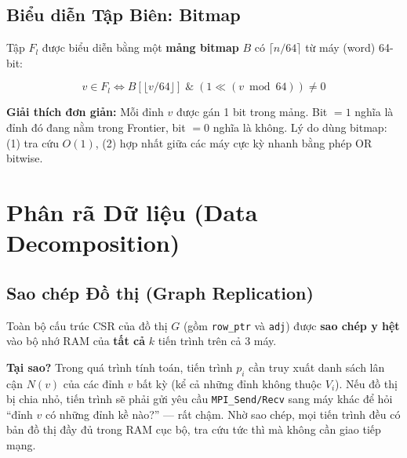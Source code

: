 \documentclass[12pt,a4paper]{article}
\begin{document}
\subsection{Biểu diễn Tập Biên: Bitmap}

Tập $F_l$ được biểu diễn bằng một \textbf{mảng bitmap} $B$ có $\lceil n / 64 \rceil$ từ máy (word) 64-bit:

\begin{equation}
v \in F_l \iff B\left[\lfloor v / 64 \rfloor\right] \;\&\; (1 \ll (v \bmod 64)) \neq 0
\end{equation}

\begin{explain}
\textbf{Giải thích đơn giản:} Mỗi đỉnh $v$ được gán 1 bit trong mảng. Bit $= 1$ nghĩa là đỉnh đó đang nằm trong Frontier, bit $= 0$ nghĩa là không. Lý do dùng bitmap: (1) tra cứu $O(1)$, (2) hợp nhất giữa các máy cực kỳ nhanh bằng phép OR bitwise.
\end{explain}

\section{Phân rã Dữ liệu (Data Decomposition)}

\subsection{Sao chép Đồ thị (Graph Replication)}

Toàn bộ cấu trúc CSR của đồ thị $G$ (gồm \texttt{row\_ptr} và \texttt{adj}) được \textbf{sao chép y hệt} vào bộ nhớ RAM của \textbf{tất cả} $k$ tiến trình trên cả 3 máy.

\begin{explain}
\textbf{Tại sao?} Trong quá trình tính toán, tiến trình $p_i$ cần truy xuất danh sách lân cận $N(v)$ của các đỉnh $v$ bất kỳ (kể cả những đỉnh không thuộc $V_i$). Nếu đồ thị bị chia nhỏ, tiến trình sẽ phải gửi yêu cầu \texttt{MPI\_Send/Recv} sang máy khác để hỏi ``đỉnh $v$ có những đỉnh kề nào?'' --- rất chậm. Nhờ sao chép, mọi tiến trình đều có bản đồ thị đầy đủ trong RAM cục bộ, tra cứu tức thì mà không cần giao tiếp mạng.
\end{explain}
\end{document}
